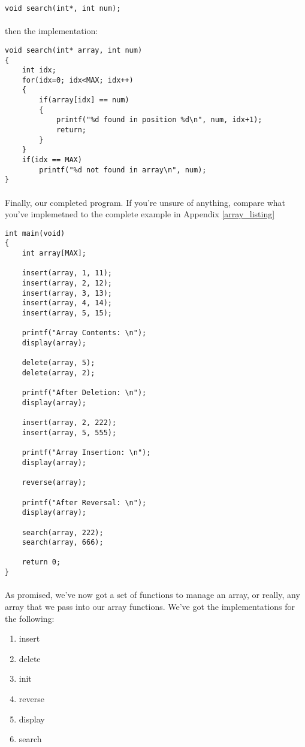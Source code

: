 \documentclass[10pt, a4paper, twosize]{article}
\begin{document}
\begin{lstlisting}
void search(int*, int num);
\end{lstlisting}

\paragraph{} then the implementation:

\begin{lstlisting}
void search(int* array, int num)
{
    int idx;
    for(idx=0; idx<MAX; idx++)
    {
        if(array[idx] == num)
        {
            printf("%d found in position %d\n", num, idx+1);
            return;
        }
    }
    if(idx == MAX)
        printf("%d not found in array\n", num);
}
\end{lstlisting}

\paragraph{} Finally, our completed program. If you're unsure of anything, compare what you've implemetned to the complete example in Appendix \ref{array_listing}

\begin{lstlisting}
int main(void)
{
    int array[MAX];

    insert(array, 1, 11);
    insert(array, 2, 12);
    insert(array, 3, 13);
    insert(array, 4, 14);
    insert(array, 5, 15);

    printf("Array Contents: \n");
    display(array);

    delete(array, 5);
    delete(array, 2);

    printf("After Deletion: \n");
    display(array);

    insert(array, 2, 222);
    insert(array, 5, 555);

    printf("Array Insertion: \n");
    display(array);

    reverse(array);

    printf("After Reversal: \n");
    display(array);

    search(array, 222);
    search(array, 666);

    return 0;
}
\end{lstlisting}

\paragraph{} As promised, we've now got a set of functions to manage an array, or really, any array that we pass into our array functions. We've got the implementations for the following:
\begin{enumerate}
\item insert
\item delete
\item init
\item reverse
\item display
\item search
\end{enumerate}
\end{document}
